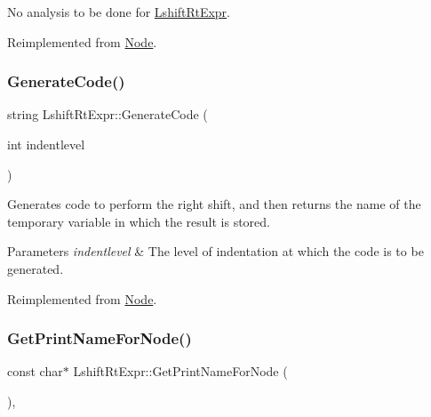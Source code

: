 No analysis to be done for \hyperlink{class_lshift_rt_expr}{Lshift\+Rt\+Expr}. 

Reimplemented from \hyperlink{class_node_a5f88d55c6f253a29def7ccc443d83d47}{Node}.

\mbox{\label{class_lshift_rt_expr_a19a964e6ac37d52a0bb3dbe7fc2f11ad}} 
\subsubsection{\texorpdfstring{Generate\+Code()}{GenerateCode()}}
{\footnotesize\ttfamily string Lshift\+Rt\+Expr\+::\+Generate\+Code (\begin{DoxyParamCaption}\item[{int}]{indentlevel }\end{DoxyParamCaption})\hspace{0.3cm}{\ttfamily [virtual]}}

Generates code to perform the right shift, and then returns the name of the temporary variable in which the result is stored. 
\begin{DoxyParams}{Parameters}
{\em indentlevel} & The level of indentation at which the code is to be generated. \\
\hline
\end{DoxyParams}


Reimplemented from \hyperlink{class_node_acb60e526730e8436056375a3055c2c32}{Node}.

\mbox{\label{class_lshift_rt_expr_af70c1654e30718a57ebdb9a85912d9f0}} 
\subsubsection{\texorpdfstring{Get\+Print\+Name\+For\+Node()}{GetPrintNameForNode()}}
{\footnotesize\ttfamily const char$\ast$ Lshift\+Rt\+Expr\+::\+Get\+Print\+Name\+For\+Node (\begin{DoxyParamCaption}{ }\end{DoxyParamCaption})\hspace{0.3cm}{\ttfamily [inline]}, {\ttfamily [virtual]}}

